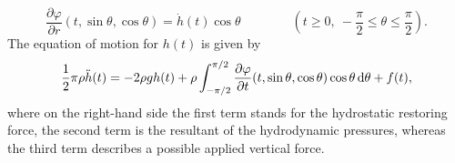 \documentclass{amsart} %
\numberwithin{equation}{section}
\theoremstyle{definition}
\begin{document}
\begin{equation} \label{2.3}
\frac{\partial\varphi}{\partial r}(t,\sin\theta,\cos\theta)=\dot h(t)\cos\theta \qquad\qquad \left(t\geqslant 0,\ -\frac{\pi}{2}\leqslant\theta\leqslant \frac{\pi}{2}\right).
\end{equation}
The equation of motion for $h(t)$ is given by
\begin{equation}\label{2.4}
\frac12 \pi\rho \ddot h(t)=-2\rho g h(t)+\rho \int_{-\pi/2}^{\pi/2}\frac{\partial\varphi}{\partial t}(t,\sin\theta,\cos\theta)\cos\theta \, {\rm d}\theta+f(t),
\end{equation}
where on the right-hand side the first term stands for the hydrostatic restoring force, the second term is the resultant of the hydrodynamic pressures, whereas the third term describes a possible applied vertical force.
\end{document}
